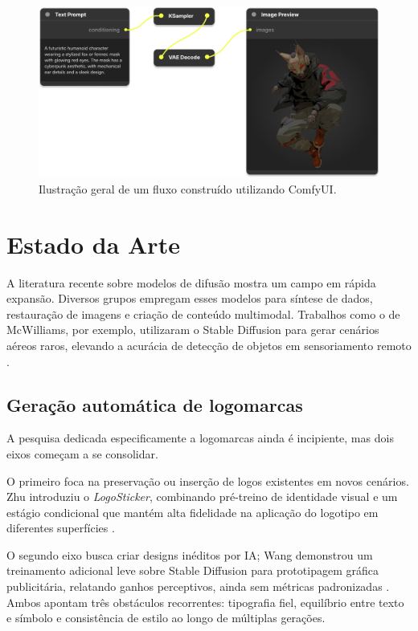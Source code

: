 \documentclass[12pt, %
openright, 
oneside, %
a4paper,    %
brazil]{facom-ufu-abntex2}
\begin{document}
\begin{figure}[H]
    \centering
    \includegraphics[width=\linewidth]{comfyui.png}
    \caption{Ilustração geral de um fluxo construído utilizando ComfyUI.}
    \label{fig:comfyUI1}
\end{figure}

\section{Estado da Arte}

A literatura recente sobre modelos de difusão mostra um campo em rápida expansão. Diversos grupos empregam esses modelos para síntese de dados, restauração de imagens e criação de conteúdo multimodal. Trabalhos como o de McWilliams, por exemplo, utilizaram o Stable Diffusion para gerar cenários aéreos raros, elevando a acurácia de detecção de objetos em sensoriamento remoto \cite{mcwilliams2024diffusionaugmentation}.

\subsection{Geração automática de logomarcas}

A pesquisa dedicada especificamente a logomarcas ainda é incipiente, mas dois eixos começam a se consolidar.

O primeiro foca na preservação ou inserção de logos existentes em novos cenários. Zhu introduziu o \textit{LogoSticker}, combinando pré-treino de identidade visual e um estágio condicional que mantém alta fidelidade na aplicação do logotipo em diferentes superfícies \cite{zhu2024logostickerinsertinglogosdiffusion}.

O segundo eixo busca criar designs inéditos por IA; Wang demonstrou um treinamento adicional leve sobre Stable Diffusion para prototipagem gráfica publicitária, relatando ganhos perceptivos, ainda sem métricas padronizadas \cite{gao2024dtia}. Ambos apontam três obstáculos recorrentes: tipografia fiel, equilíbrio entre texto e símbolo e consistência de estilo ao longo de múltiplas gerações.
\end{document}
